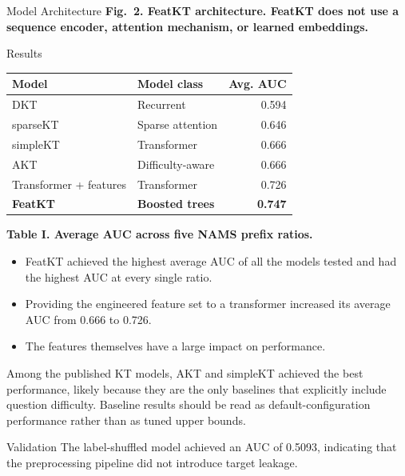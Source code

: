 \documentclass[final,xcolor={table}]{beamer}
\newcommand{\captionfont}{\fontsize{26}{31}\selectfont}
\newlength{\colwidth}
\begin{document}
\begin{frame}[t]
\begin{columns}[t]
\begin{column}{\colwidth}
\begin{block}{Model Architecture}
\vspace{0.35cm}
\justifying
{\captionfont\textbf{Fig.~2. FeatKT architecture. FeatKT does not use a
sequence encoder, attention mechanism, or learned embeddings.}}
\end{block}

\begin{block}{Results}
\centering
{\fontsize{26}{31}\selectfont
\begin{tabular}{@{}p{8.1cm}p{10.7cm}r@{}}
\toprule
\textbf{Model} & \textbf{Model class} & \textbf{Avg. AUC} \\
\midrule
DKT                    & Recurrent              & 0.594 \\
sparseKT               & Sparse attention       & 0.646 \\
simpleKT               & Transformer            & 0.666 \\
AKT                    & Difficulty-aware       & 0.666 \\
Transformer + features & Transformer            & 0.726 \\
\rowcolor{softred}
\textbf{FeatKT}        & \textbf{Boosted trees} & \textbf{0.747} \\
\bottomrule
\end{tabular}}

\vspace{0.30cm}
{\captionfont\textbf{Table I. Average AUC across five NAMS prefix ratios.}}

\vspace{0.35cm}
\justifying
\begin{itemize}\setlength{\itemsep}{0.35ex}
  \item FeatKT achieved the highest average AUC of all the models tested and
        had the highest AUC at every single ratio.
  \item Providing the engineered feature set to a transformer increased its
        average AUC from 0.666 to 0.726.
  \item The features themselves have a large impact on performance.
\end{itemize}

Among the published KT models, AKT and simpleKT achieved the best
performance, likely because they are the only baselines that explicitly
include question difficulty. Baseline results should be read as
default-configuration performance rather than as tuned upper bounds.
\end{block}

\begin{block}{Validation}
The label-shuffled model achieved an AUC of 0.5093, indicating that the
preprocessing pipeline did not introduce target leakage.


\end{block}
\end{column}
\end{columns}
\end{frame}
\end{document}
